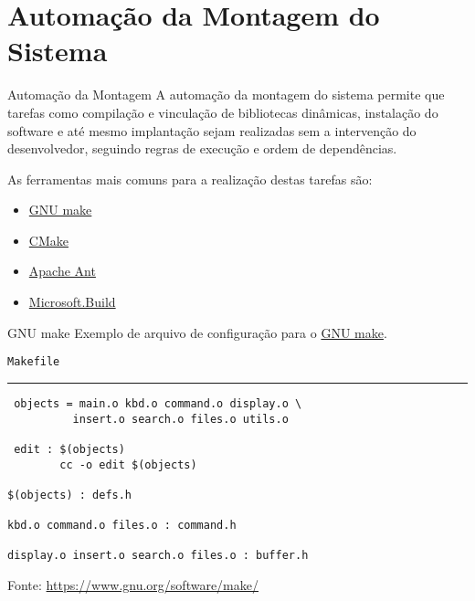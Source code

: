 
\frame{\maketitle}

\section{Automação da Montagem do Sistema}

\begin{frame}{Automação da Montagem}
 A automação da montagem do sistema permite que tarefas como
compilação e vinculação de bibliotecas dinâmicas, instalação do
software e até mesmo implantação sejam realizadas sem a intervenção do
desenvolvedor, seguindo regras de execução e ordem de dependências.

As ferramentas mais comuns para a realização destas tarefas são:

\begin{itemize}
\item \href{https://www.gnu.org/software/make/}{GNU make}
\item \href{https://cmake.org/}{CMake}
\item \href{http://ant.apache.org/}{Apache Ant}
\item \href{https://github.com/microsoft/msbuild}{Microsoft.Build}
\end{itemize}
\end{frame}

\begin{frame}[fragile]{GNU make}
 Exemplo de arquivo de configuração para o \href{https://www.gnu.org/software/make/}{GNU make}.\bigskip

{\tt Makefile}
\hrule\small
\begin{verbatim}
 objects = main.o kbd.o command.o display.o \
          insert.o search.o files.o utils.o

 edit : $(objects)
        cc -o edit $(objects)

$(objects) : defs.h

kbd.o command.o files.o : command.h

display.o insert.o search.o files.o : buffer.h
\end{verbatim}

\tiny
Fonte: \url{https://www.gnu.org/software/make/}
\end{frame}


